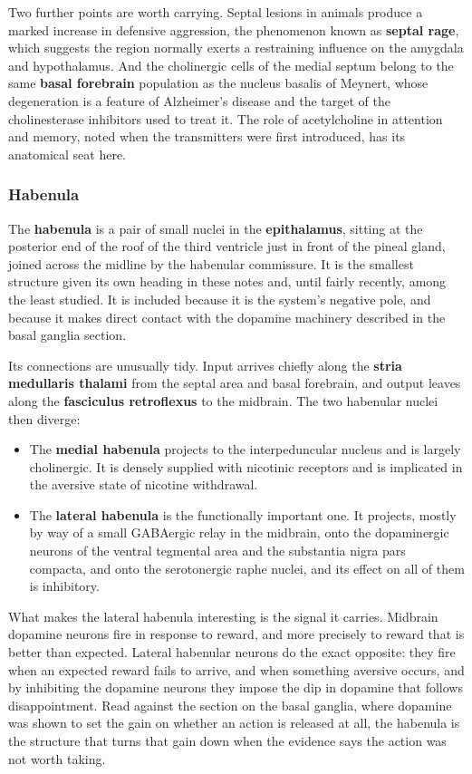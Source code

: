 \documentclass[11pt]{article}
\begin{document}
Two further points are worth carrying. Septal lesions in animals produce a marked increase in defensive aggression, the phenomenon known as \textbf{septal rage}, which suggests the region normally exerts a restraining influence on the amygdala and hypothalamus. And the cholinergic cells of the medial septum belong to the same \textbf{basal forebrain} population as the nucleus basalis of Meynert, whose degeneration is a feature of Alzheimer's disease and the target of the cholinesterase inhibitors used to treat it. The role of acetylcholine in attention and memory, noted when the transmitters were first introduced, has its anatomical seat here.

\subsubsection{Habenula}

The \textbf{habenula} is a pair of small nuclei in the \textbf{epithalamus}, sitting at the posterior end of the roof of the third ventricle just in front of the pineal gland, joined across the midline by the habenular commissure. It is the smallest structure given its own heading in these notes and, until fairly recently, among the least studied. It is included because it is the system's negative pole, and because it makes direct contact with the dopamine machinery described in the basal ganglia section.

Its connections are unusually tidy. Input arrives chiefly along the \textbf{stria medullaris thalami} from the septal area and basal forebrain, and output leaves along the \textbf{fasciculus retroflexus} to the midbrain. The two habenular nuclei then diverge:

\begin{itemize}
    \item The \textbf{medial habenula} projects to the interpeduncular nucleus and is largely cholinergic. It is densely supplied with nicotinic receptors and is implicated in the aversive state of nicotine withdrawal.
    \item The \textbf{lateral habenula} is the functionally important one. It projects, mostly by way of a small GABAergic relay in the midbrain, onto the dopaminergic neurons of the ventral tegmental area and the substantia nigra pars compacta, and onto the serotonergic raphe nuclei, and its effect on all of them is inhibitory.
\end{itemize}

What makes the lateral habenula interesting is the signal it carries. Midbrain dopamine neurons fire in response to reward, and more precisely to reward that is better than expected. Lateral habenular neurons do the exact opposite: they fire when an expected reward fails to arrive, and when something aversive occurs, and by inhibiting the dopamine neurons they impose the dip in dopamine that follows disappointment. Read against the section on the basal ganglia, where dopamine was shown to set the gain on whether an action is released at all, the habenula is the structure that turns that gain down when the evidence says the action was not worth taking.
\end{document}
